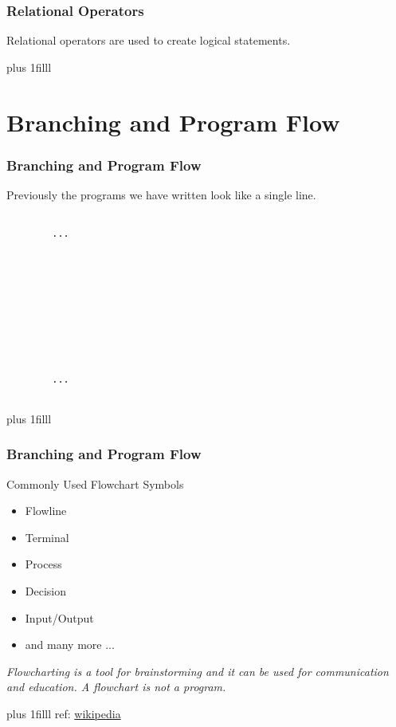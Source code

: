 \documentclass[fleqn]{beamer} %
\newcommand{\sectiontitleII}{Relational Operators}
\newcommand{\sectiontitleIII}{Branching and Program Flow}
\newcommand{\btVFill}{\vskip0pt plus 1filll}
\begin{document}
	\begin{frame}[label=sectionII,containsverbatim] \small
	\frametitle{\sectiontitleII}
		\vspace*{5mm}
		Relational operators are used to create logical statements.

		\btVFill
	\end{frame}




\section{\sectiontitleIII}	
	\begin{frame}[label=sectionIII,containsverbatim] \small
		\frametitle{\sectiontitleIII}    
	
		Previously the programs we have written look like a single line. 
	
		\begin{lstlisting}
		
		...
		
		
		
		
		
		
		
		
		
		
		...			
		
		\end{lstlisting}
		 

		\btVFill
	\end{frame}

	\begin{frame}[label=sectionIII,containsverbatim] \small
	\frametitle{\sectiontitleIII}    
	
	Commonly Used Flowchart Symbols
	
	\begin{itemize}
		\item Flowline
		\item Terminal
		\item Process
		\item Decision
		\item Input/Output
		\item and many more ... 
		
	\end{itemize}

	{\it Flowcharting is a tool for brainstorming and it can be used for communication and education. A flowchart is not a program. }
	
	
	\btVFill
	\tiny{ref: \href{https://en.wikipedia.org/wiki/Flowchart}{wikipedia}} 
\end{frame}
\end{document}
